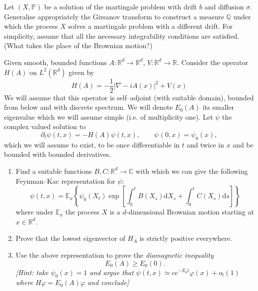\documentclass{article}
\newcommand{\mathd}{\mathrm{d}}
\newcommand{\tmtextit}[1]{{\itshape{#1}}}
\newenvironment{enumeratealpha}{\begin{enumerate}[a{\textup{)}}] }{\end{enumerate}}
{\theorembodyfont{\rmfamily\small}\newtheorem{exercise}{Exercise}}
\begin{document}
\hrulefill

\begin{exercise}
  [Pts 3] Let $(X, \mathbb{P})$ be a solution of the martingale problem with
  drift $b$ and diffusion $\sigma$. Generalise appropriately the Girsanov
  transform to construct a measure $\mathbb{Q}$ under which the process $X$
  solves a martingale problem with a different drift. For simplicity, assume
  that all the necessary integrability conditions are satisfied. (What takes
  the place of the Brownian motion?)
\end{exercise}

\hrulefill

\begin{exercise}
  [Pts 3+3+3] Given smooth, bounded functions $A : \mathbb{R}^d \rightarrow
  \mathbb{R}^d$, $V : \mathbb{R}^d \rightarrow \mathbb{R}$. Consider the
  operator $H (A)$ on $L^2 (\mathbb{R}^d)$ given by
  \[ H (A) = - \frac{1}{2} | \nabla - i A (x) |^2 + V (x) \]
  We will assume that this operator is self--adjoint (with suitable domain),
  bounded from below and with discrete spectrum. We will denote $E_0 (A)$ its
  smaller eigenvalue which we will assume simple (i.e. of multiplicity one).
  Let $\psi$ the complex valued solution to
  \[ \partial_t \psi (t, x) = - H (A) \psi (t, x), \qquad \psi_{} (0, x) =
     \psi_0 (x), \]
  which we will assume to exist, to be once differentiable in $t$ and twice in
  $x$ and be bounded with bounded derivatives.
  \begin{enumeratealpha}
    \item Find a suitable functions $B, C : \mathbb{R}^d \rightarrow
    \mathbb{C}$ with which we can give the following Feynman--Kac
    representation for $\psi$:
    \[ \psi (t, x) =\mathbb{E}_x \left\{ \psi_0 (X_t) \exp \left[ \int_0^t B
       (X_s) \mathd X_s + \int_0^t C (X_s) \mathd s \right] \right\} \]
    where under $\mathbb{E}_x$ the process $X$ is a $d$-dimensional Brownian
    motion starting at $x \in \mathbb{R}^d$.
    
    \item Prove that the lowest eigenvector of $H_A$ is strictly positive
    everywhere.
    
    \item Use the above representation to prove the \tmtextit{diamagnetic
    inequality}
    \[ E_0 (A) \geqslant E_0 (0) . \]
    {\small{\tmtextit{[Hint: take $\psi_0 (x) = 1$ and argue that $\psi (t, x)
    \simeq c e^{- E_0 t} \varphi (x) + o_t (1)$ where $H \varphi = E_0 (A)
    \varphi$ and conclude]}}}
  \end{enumeratealpha}
\end{exercise}

\hrulefill

\
\end{document}
